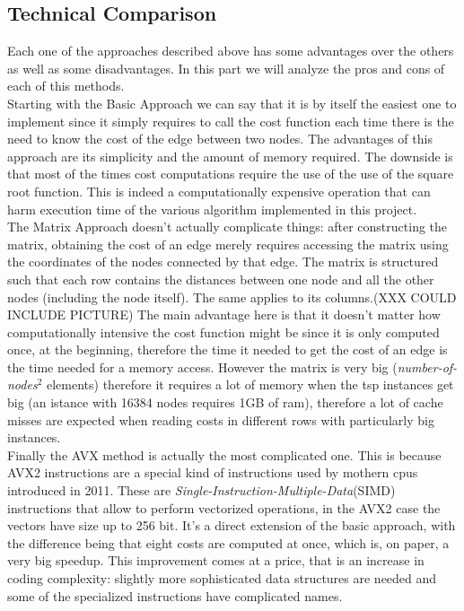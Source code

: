 \documentclass[a4paper]{article}
\begin{document}
\subsection[short]{Technical Comparison}

Each one of the approaches described above has some advantages over the others as well as some disadvantages. In this part we will analyze the pros and cons of each of this methods.\\ 
Starting with the Basic Approach we can say that it is by itself the easiest one to implement since it simply requires to call the cost function each time there is the need to know the cost of the edge between two nodes. The advantages of this approach are its simplicity and the amount of memory required. The downside is that most of the times cost computations require the use of the use of the square root function. This is indeed a computationally expensive operation that can harm execution time of the various algorithm implemented in this project.\\
The Matrix Approach doesn't actually complicate things: after constructing the matrix, obtaining the cost of an edge merely requires accessing the matrix using the coordinates of the nodes connected by that edge. The matrix is structured such that each row contains the distances between one node and all the other nodes (including the node itself). The same applies to its columns.(XXX COULD INCLUDE PICTURE) The main advantage here is that it doesn't matter how computationally intensive the cost function might be since it is only computed once, at the beginning, therefore the time it needed to get the cost of an edge is the time needed for a memory access. However the matrix is very big (\textit{number-of-nodes}$^2$ elements) therefore it requires a lot of memory when the tsp instances get big (an istance with 16384 nodes requires 1GB of ram), therefore a lot of cache misses are expected when reading costs in different rows with particularly big instances. \\
Finally the AVX method is actually the most complicated one. This is because AVX2 instructions are a special kind of instructions used by mothern cpus introduced in 2011\cite{avxWikipedia}. These are \textit{Single-Instruction-Multiple-Data}(SIMD) instructions that allow to perform vectorized operations, in the AVX2 case the vectors have size up to 256 bit\cite{avxWikipedia}. It's a direct extension of the basic approach, with the difference being that eight costs are computed at once, which is, on paper, a very big speedup. This improvement comes at a price, that is an increase in coding complexity: slightly more sophisticated data structures are needed and some of the specialized instructions have complicated names.
\end{document}
